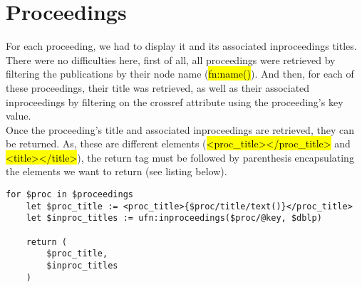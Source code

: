 \section{Proceedings}

\noindent For each proceeding, we had to display it and its associated
inproceedings titles.\\

There were no difficulties here, first of all, all
proceedings were retrieved by filtering the publications by their node name
(\hl{fn:name()}). And then, for each of these proceedings, their title was
retrieved, as well as their associated inproceedings by filtering on the
crossref attribute using the proceeding's key value.\\

Once the proceeding's title and associated inproceedings are retrieved, they can
be returned. As, these are different elements (\hl{<proc\_title></proc\_title>}
and \hl{<title></title>}), the return tag must be followed by parenthesis
encapsulating the elements we want to return (see listing below).\\

\begin{lstlisting}
for $proc in $proceedings
    let $proc_title := <proc_title>{$proc/title/text()}</proc_title>
    let $inproc_titles := ufn:inproceedings($proc/@key, $dblp)

    return (
        $proc_title,
        $inproc_titles
    )
\end{lstlisting}

\newpage
